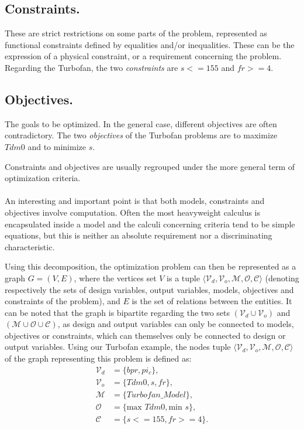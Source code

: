 \subsection{Constraints.}

These are strict restrictions on some parts of the problem, represented as functional constraints defined by equalities and/or inequalities. These can be the expression of a physical constraint, or a requirement concerning the problem.
Regarding the Turbofan, the two \emph{constraints} are $s <= 155$ and $fr >=4$.

\subsection{Objectives.}

The goals to be optimized. In the general case, different objectives are often contradictory.
The two \emph{objectives} of the Turbofan problems are to maximize $Tdm0$ and to minimize $s$.

Constraints and objectives are usually regrouped under the more general term of optimization criteria. 

\paragraph*{}
An interesting and important point is that both models, constraints and objectives involve computation. Often the most heavyweight calculus is encapsulated inside a model and the calculi concerning criteria tend to be simple equations, but this is neither an absolute requirement nor a discriminating characteristic.

Using this decomposition, the optimization problem can then be represented as a graph $ G = (V, E)$, where the vertices set $V$ is a tuple $\langle \mathcal{V}_d, \mathcal{V}_o, \mathcal{M}, \mathcal{O}, \mathcal{C}\rangle$ (denoting respectively the sets of design variables, output variables, models, objectives and constraints of the problem), and $E$ is the set of relations between the entities. It can be noted that the graph is bipartite regarding the two sets $(\mathcal{V}_d \cup \mathcal{V}_o)$ and $(\mathcal{M} \cup \mathcal{O} \cup \mathcal{C})$, as design and output variables can only be connected to models, objectives or constraints, which can themselves only be connected to design or output variables.
Using our Turbofan example, the nodes tuple $\langle \mathcal{V}_d, \mathcal{V}_o, \mathcal{M}, \mathcal{O}, \mathcal{C}\rangle$ of the graph representing this problem is defined as:
\begin{align*}
	\mathcal{V}_d &= \{bpr, pi_c\}, \\
	\mathcal{V}_o &= \{Tdm0, s, fr\},\\
	\mathcal{M} &= \{Turbofan\_Model\},\\
	\mathcal{O} &= \{\text{max }Tdm0, \text{min }s\},\\
	\mathcal{C} &= \{s <= 155, fr >= 4\}.
\end{align*}

